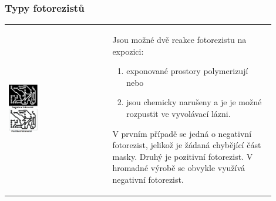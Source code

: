 \documentclass{beamer}
\begin{document}
\begin{frame}
	\frametitle{Typy fotorezistů}

	\begin{center}
		\begin{tabular}{m{0.35\linewidth} m{0.55\linewidth}}
		 \includegraphics[width=0.3\textwidth]{negativAPozitiv.png} &
			Jsou možné dvě reakce fotorezistu na expozici:
			
			\begin{enumerate}
				\item exponované prostory polymerizují nebo
				\item jsou chemicky narušeny a je je možné rozpustit ve vyvolávací lázni.
			\end{enumerate}
			V prvním případě se jedná o negativní fotorezist, jelikož je žádaná chybějící část masky. Druhý je pozitivní fotorezist. V hromadné výrobě se obvykle využívá negativní fotorezist. 
		\end{tabular}
	\end{center}
	
\end{frame}
\end{document}
